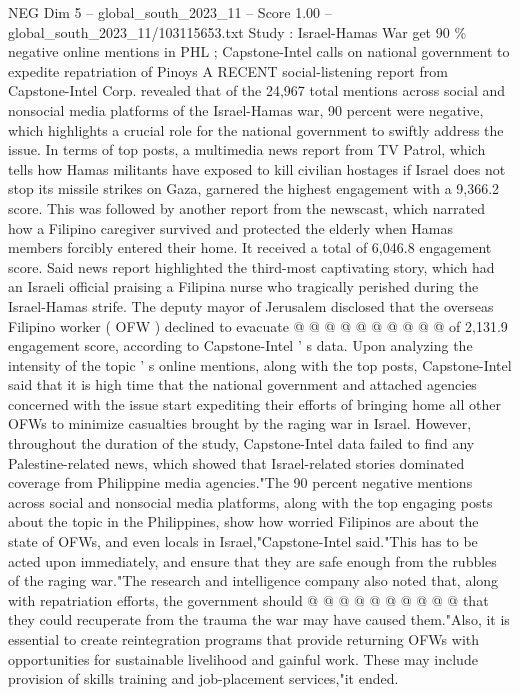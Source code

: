 \begin{textsample}{NEG Dim 5 – global\_south\_2023\_11 – Score 1.00 – global\_south\_2023\_11/103115653.txt}  \label{ex:f5_neg_209}
Study : Israel-Hamas War get 90 \% negative online mentions in PHL ; Capstone-Intel calls on national government to expedite repatriation of Pinoys A RECENT social-listening report from Capstone-Intel Corp. revealed that of the 24,967 total mentions across social and nonsocial media platforms of the Israel-Hamas war, 90 percent were negative, which highlights a crucial role for the national government to swiftly address the issue.
In terms of top posts, a multimedia news report from TV Patrol, which tells how Hamas militants have exposed to kill civilian hostages if Israel does not stop its missile strikes on Gaza, garnered the highest engagement with a 9,366.2 score.
This was followed by another report from the newscast, which narrated how a Filipino caregiver survived and protected the elderly when Hamas members forcibly entered their home.
It received a total of 6,046.8 engagement score.
Said news report highlighted the third-most captivating story, which had an Israeli official praising a Filipina nurse who tragically perished during the Israel-Hamas strife.
The deputy mayor of Jerusalem disclosed that the overseas Filipino worker ( OFW ) declined to evacuate @ @ @ @ @ @ @ @ @ @ of 2,131.9 engagement score, according to Capstone-Intel ' s data.
Upon analyzing the intensity of the topic ' s online mentions, along with the top posts, Capstone-Intel said that it is high time that the national government and attached agencies concerned with the issue start expediting their efforts of bringing home all other OFWs to minimize casualties brought by the raging war in Israel.
However, throughout the duration of the study, Capstone-Intel data failed to find any Palestine-related news, which showed that Israel-related stories dominated coverage from Philippine media agencies."The 90 percent negative mentions across social and nonsocial media platforms, along with the top engaging posts about the topic in the Philippines, show how worried Filipinos are about the state of OFWs, and even locals in Israel,"Capstone-Intel said."This has to be acted upon immediately, and ensure that they are safe enough from the rubbles of the raging war."The research and intelligence company also noted that, along with repatriation efforts, the government should @ @ @ @ @ @ @ @ @ @ that they could recuperate from the trauma the war may have caused them."Also, it is essential to create reintegration programs that provide returning OFWs with opportunities for sustainable livelihood and gainful work.
These may include provision of skills training and job-placement services,"it ended.

\end{textsample}
